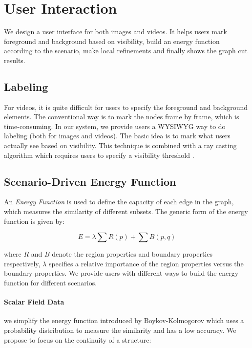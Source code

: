 
\section{User Interaction}
\label{section user interaction}

We design a user interface for both images and videos.
It helps users mark foreground and background based on visibility, build an energy function according to the scenario, make local refinements and finally shows the graph cut results.

\subsection{Labeling}

For videos, it is quite difficult for users to specify the foreground and background elements.
The conventional way is to mark the nodes frame by frame, which is time-consuming.
In our system, we provide users a WYSIWYG way to do labeling (both for images and videos).
The basic idea is to mark what users actually see based on visibility.
This technique is combined with a ray casting algorithm which requires users to specify a visibility threshold \cite{05BS, 11CM}.

\subsection{Scenario-Driven Energy Function}

An \textit{Energy Function} is used to define the capacity of each edge in the graph, which measures the similarity of different subsets.
The generic form of the energy function is given by:

\begin{equation}
\label{equation energy function}
E = \lambda \sum R(p) + \sum B(p, q)
\end{equation}

where $R$ and $B$ denote the region properties and boundary properties respectively, $\lambda$ specifies a relative importance of the region properties versus the boundary properties.
We provide users with different ways to build the energy function for different scenarios.

\paragraph*{\textbf{Scalar Field Data}} we simplify the energy function introduced by Boykov-Kolmogorov \cite{04BK} which uses a probability distribution to measure the similarity and has a low accuracy.
We propose to focus on the continuity of a structure:


